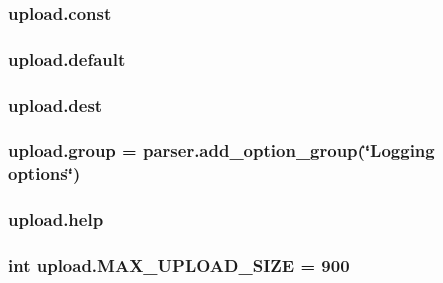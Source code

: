 \subsubsection[{\texorpdfstring{const}{const}}]{\setlength{\rightskip}{0pt plus 5cm}upload.\+const}\hypertarget{namespaceupload_a985aa9a71de3eb507344df65700c696d}{}\label{namespaceupload_a985aa9a71de3eb507344df65700c696d}
\subsubsection[{\texorpdfstring{default}{default}}]{\setlength{\rightskip}{0pt plus 5cm}upload.\+default}\hypertarget{namespaceupload_af4be925d9a50d5ad134d86400509d0f2}{}\label{namespaceupload_af4be925d9a50d5ad134d86400509d0f2}
\subsubsection[{\texorpdfstring{dest}{dest}}]{\setlength{\rightskip}{0pt plus 5cm}upload.\+dest}\hypertarget{namespaceupload_a770d9c7b49b1fede80de6078d5e49af7}{}\label{namespaceupload_a770d9c7b49b1fede80de6078d5e49af7}
\subsubsection[{\texorpdfstring{group}{group}}]{\setlength{\rightskip}{0pt plus 5cm}upload.\+group = parser.\+add\+\_\+option\+\_\+group(\char`\"{}Logging options\char`\"{})}\hypertarget{namespaceupload_a9d33d66de17175dced88ffe95f079226}{}\label{namespaceupload_a9d33d66de17175dced88ffe95f079226}
\subsubsection[{\texorpdfstring{help}{help}}]{\setlength{\rightskip}{0pt plus 5cm}upload.\+help}\hypertarget{namespaceupload_abfc23c9aa2d9b777678da117a85929a5}{}\label{namespaceupload_abfc23c9aa2d9b777678da117a85929a5}
\subsubsection[{\texorpdfstring{M\+A\+X\+\_\+\+U\+P\+L\+O\+A\+D\+\_\+\+S\+I\+ZE}{MAX_UPLOAD_SIZE}}]{\setlength{\rightskip}{0pt plus 5cm}int upload.\+M\+A\+X\+\_\+\+U\+P\+L\+O\+A\+D\+\_\+\+S\+I\+ZE = 900}\hypertarget{namespaceupload_aad5b1a43823e2a710a2f78e33dde8901}{}\label{namespaceupload_aad5b1a43823e2a710a2f78e33dde8901}
